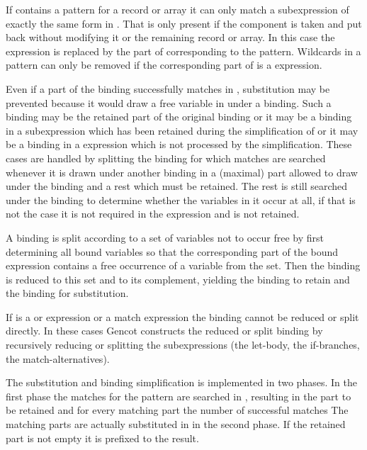 If  contains a  pattern for a record or array it can only match a  subexpression 
of exactly the same form in . That is only present if the component is taken and put back without modifying it or the 
remaining record or array. In this case the  expression is replaced by the part of  corresponding to 
the  pattern. Wildcards in a  pattern can only be removed if the corresponding part of 
is a  expression.

Even if a part of the binding successfully matches in , substitution may be prevented because it would draw a 
free variable in  under a binding. Such a binding may be the retained part of the original binding or it may 
be a binding in a  subexpression which has been retained during the simplification of 
or it may be a binding in a  expression which is not processed by the simplification. These cases are handled
by splitting the binding for which matches are searched whenever it is drawn under another binding in a (maximal) part allowed
to draw under the binding and a rest which must be retained. The rest is still searched under the binding to determine whether
the variables in it occur at all, if that is not the case it is not required in the expression and is not retained.

A binding is split according to a set of variables not to occur free by first determining all bound variables so that the 
corresponding part of the bound expression contains a free occurrence of a variable from the set. Then the binding is reduced
to this set and to its complement, yielding the binding to retain and the binding for substitution.

If  is a  or  expression or a match expression the binding cannot be reduced or split directly.
In these cases Gencot constructs the reduced or split binding by recursively reducing or splitting the subexpressions (the 
let-body, the if-branches, the match-alternatives).

The substitution and binding simplification is implemented in two phases. In the first phase the matches for the pattern are 
searched in , resulting in the part to be retained and for every matching part the number of successful matches
The matching parts are actually substituted in  in the second phase. If the retained part is not empty it is 
prefixed to the result.


